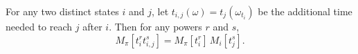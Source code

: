 For any two distinct states $i$ and $j$, let $t_{i,j}(\omega) = t_j(\omega_{t_i})$ be the additional time needed to reach $j$ after $i$. Then for any powers $r$ and $s$,
$$M_\pi[t_i^r t_{i,j}^s] = M_\pi[t_i^r] \, M_i[t_j^s].$$
